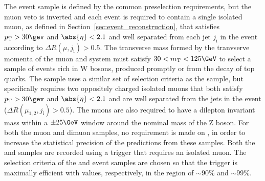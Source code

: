 The \mj event sample is defined by the common preselection
requirements, but the muon veto is inverted and each event is required
to contain a single isolated muon, as defined in
Section~\ref{sec:event_reconstruction}, that satisfies $\Pt > 30\gev$
and $\abs{\eta} < 2.1$ and well separated from each jet $j_{\text{i}}$
in the event according to $\Delta R(\mu,j_{\text{i}}) > 0.5$.
The transverse mass formed by the tranvserve momenta of the muon and
\ptvecmiss system must satisfy $30 < m_\text{T} < 125\GeV$ to select a
sample of events rich in W bosons, produced promptly or from the decay
of top quarks. The \mmj sample uses a similar set of selection
criteria as the \mj sample, but specifically requires two oppositely
charged isolated muons that both satisfy $\Pt > 30\gev$ and
$\abs{\eta} < 2.1$ and are well separated from the jets in the event
($\Delta R(\mu_{1,2},j_{\text{i}}) > 0.5$). The muons are also
required to have a dilepton invariant mass within a $\pm 25\GeV$
window around the nominal mass of the Z boson. For both the muon and
dimuon samples, no requirement is made on \alphat, in order to
increase the statistical precision of the predictions from these
samples. Both the \mj and \mmj samples are recorded using a trigger
that requires an isolated muon. The selection criteria of the \mj and
\mmj event samples are chosen so that the trigger is maximally
efficient with values, respectively, in the region of $\sim$90\% and
$\sim$99\%.
